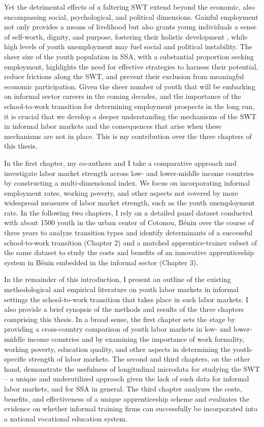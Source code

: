 \documentclass[
  a4paper, twoside, 12pt]{book}
\begin{document}
Yet the detrimental effects of a faltering SWT extend beyond the economic, also encompassing social, psychological, and political dimensions. Gainful employment not only provides a means of livelihood but also grants young individuals a sense of self-worth, dignity, and purpose, fostering their holistic development \autocite{mains2011}, while high levels of youth unemployment may fuel social and political instability. The sheer size of the youth population in SSA, with a substantial proportion seeking employment, highlights the need for effective strategies to harness their potential, reduce frictions along the SWT, and prevent their exclusion from meaningful economic participation. Given the sheer number of youth that will be embarking on informal sector careers in the coming decades, and the importance of the school-to-work transition for determining employment prospects in the long run, it is crucial that we develop a deeper understanding the mechanisms of the SWT in informal labor markets and the consequences that arise when these mechanisms are not in place. This is my contribution over the three chapters of this thesis.

In the first chapter, my co-authors and I take a comparative approach and investigate labor market strength across low- and lower-middle income countries by constructing a multi-dimensional index. We focus on incorporating informal employment rates, working poverty, and other aspects not covered by more widespread measures of labor market strength, such as the youth unemployment rate. In the following two chapters, I rely on a detailed panel dataset conducted with about 1500 youth in the urban center of Cotonou, Bénin over the course of three years to analyze transition types and identify determinants of a successful school-to-work transition (Chapter 2) and a matched apprentice-trainer subset of the same dataset to study the costs and benefits of an innovative apprenticeship system in Bénin embedded in the informal sector (Chapter 3).

In the remainder of this introduction, I present an outline of the existing methodological and empirical literature on youth labor markets in informal settings the school-to-work transition that takes place in such labor markets. I also provide a brief synopsis of the methods and results of the three chapters comprising this thesis. In a broad sense, the first chapter sets the stage by providing a cross-country comparison of youth labor markets in low- and lower-middle income countries and by examining the importance of work formality, working poverty, education quality, and other aspects in determining the youth-specific strength of labor markets. The second and third chapters, on the other hand, demonstrate the usefulness of longitudinal microdata for studying the SWT -- a unique and underutilized approach given the lack of such data for informal labor markets, and for SSA in general. The third chapter analyzes the costs, benefits, and effectiveness of a unique apprenticeship scheme and evaluates the evidence on whether informal training firms can successfully be incorporated into a national vocational education system.
\end{document}

